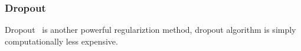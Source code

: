 \subsubsection{Dropout}

Dropout~\cite{JMLR:v15:srivastava14a} is another powerful regulariztion method, dropout algorithm is simply  computationally less expensive. 